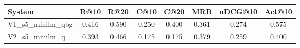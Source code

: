 \begin{tabular}{lccccccc}
\toprule
System & R@10 & R@20 & C@10 & C@20 & MRR & nDCG@10 & Act@10 \\
\midrule
V1_s5_minilm_qbg & 0.416 & 0.590 & 0.250 & 0.400 & 0.361 & 0.274 & 0.575 \\
V2_s5_minilm_q & 0.393 & 0.466 & 0.175 & 0.175 & 0.379 & 0.259 & 0.400 \\
\bottomrule
\end{tabular}
